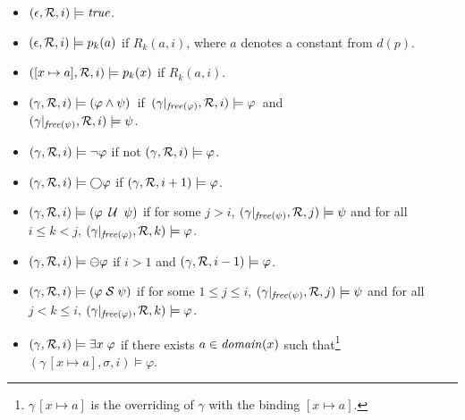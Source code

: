 \begin{itemize}

\item $( \epsilon , {\cal R} , i ) \models \mathit{true}$.

\item $( \epsilon ,  {\cal R} , i )
 \models p_k ( a ) $ if $R_k ( a, i )$, where $a$ denotes a constant from  $d(p)$.

\item $( [ x \mapsto a ] , {\cal R} , i ) \models p_k ( x )$ if $R_k ( a , i )$.

\item $( \gamma,  {\cal R} , i ) \models ( \varphi \wedge \psi ) $~if~$(
\gamma |_{\mathit{free}  ( \varphi )} , {\cal R} , i ) \models \varphi$~and  \\
$( \gamma |_{\mathit{free} ( \psi ) } , {\cal R} , i ) \models \psi$. 

\item $( \gamma , {\cal R} , i ) \models \neg \varphi$ if not $( \gamma , {\cal R} , i ) 
\models \varphi$.

\item $( \gamma , {\cal R} , i) \models \bigcirc \varphi$ if 
$(\gamma , {\cal R} , i + 1) \models
\varphi$.

\item $( \gamma , {\cal R} , i ) \models ( \varphi \; \mathbin{\mathcal{U}} \; \psi )$ if
for some $j > i$, $( \gamma |_{\mathit{free} ( \psi )} , {\cal R} , j) 
\models \psi $ and for all $i \leq k < j $,
$( \gamma |_{\mathit{free} ( \varphi )} , {\cal R} , k) \models \varphi$.


\item $( \gamma , {\cal R} , i) \models \ominus \varphi$ if $i>1$ and
$(\gamma , {\cal R} , i-1) \models
\varphi$.

\item $( \gamma , {\cal R} , i ) \models ( \varphi \; {\cal S} \; \psi )$ if
for some $1 \le j \leq i$, $( \gamma |_{\mathit{free} ( \psi )} , {\cal R} , j) 
\models \psi $ and for all $j < k \leq i$,
$( \gamma |_{\mathit{free} ( \varphi )} , {\cal R} , k) \models \varphi$.





\item $( \gamma , {\cal R} , i) \models \exists x \; \varphi$ if
there exists $a \in \mathit{domain} ( x )$ such that\footnote{$\gamma \, [ x \mapsto a ]$
is the overriding of $\gamma$ with the binding $[ x \mapsto a ]$.}
$( \gamma \, [ x \mapsto a ], \sigma , i) \models \varphi$.

\end{itemize}


